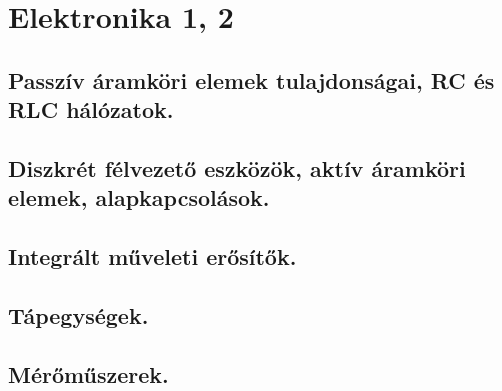 \section{Elektronika 1, 2}
\subsection{Passzív áramköri elemek tulajdonságai, RC és RLC hálózatok.}

\subsection{Diszkrét félvezető eszközök, aktív áramköri elemek, alapkapcsolások.}

\subsection{Integrált műveleti erősítők.}

\subsection{Tápegységek.}

\subsection{Mérőműszerek.}
